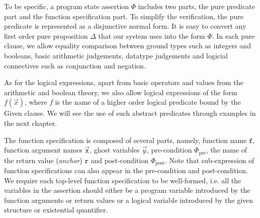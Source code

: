 To be specific, a program state assertion $\Phi$ includes two parts, 
the pure predicate part and the function specification part. 
To simplify the verification, the pure predicate is represented as 
a disjunctive normal form. It is easy to convert any first order pure
proposition $\Delta$ that our system uses into the form $\Phi$. In each pure clause,
we allow equality comparison between ground types such as integers and booleans,
basic arithmetic judgements, datatype judgements and logicial connectives
such as conjunction and negation. 

As for the logical expressions, apart from basic operators and values from
the arithmetic and boolean theory, we also allow logical expressions of the form
$f(\vec{x})$, where $f$ is the name of a higher order logical predicate bound
by the \textrm{Given} clause. We will see the use of such abstract predicates
through examples in the next chapter.

The function specification is composed of several parts, namely, function name
$\texttt{f}$, function argument names $\vec{\texttt{x}}$, ghost variables $\vec{y}$, pre-condition $\Phi_{\text{pre}}$, the name of the return value (\emph{anchor}) $\texttt{r}$ and post-condition $\Phi_{\text{post}}$. Note that sub-expression
of function specifications can also appear in the pre-condition and post-condition. We require each top-level function specification to be 
well-formed, i.e. all the variables in the assertion should either be a
program variable introduced by the function arguments or return values or a
logical variable introduced by the given structure or existential quantifier.



